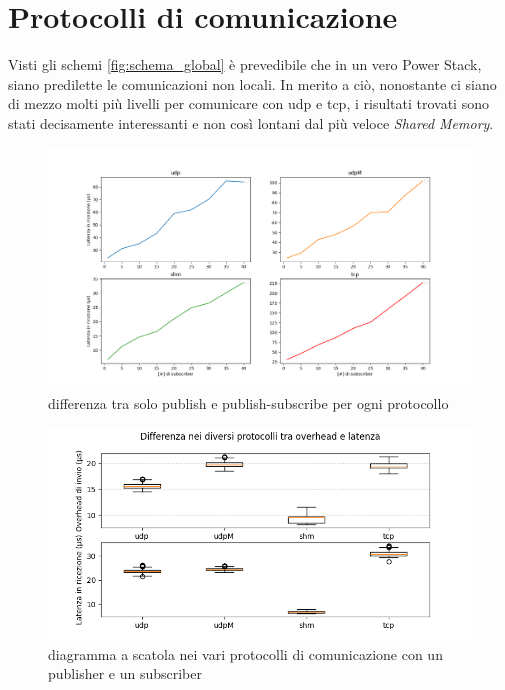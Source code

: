 \section{Protocolli di comunicazione}
Visti gli schemi \ref{fig:schema_global} è prevedibile che in un vero Power Stack, siano predilette le comunicazioni non locali. In merito a ciò, nonostante ci siano di mezzo molti più livelli per comunicare con udp e tcp, i risultati trovati sono stati decisamente interessanti e non così lontani dal più veloce \emph{Shared Memory}.

\begin{figure}[H]
    \includegraphics[width=\textwidth]{./results/test3_different_protocol_send_receive.png} 
        \caption{differenza tra solo publish e publish-subscribe per ogni protocollo}%
        \label{fig:test3_different_protocols}
\end{figure}


\begin{figure}[H]
    \includegraphics[width=\textwidth]{./results/test1_box_sr_1p1s.png} 
        \caption{diagramma a scatola nei vari protocolli di comunicazione con un publisher e un subscriber}
        \label{fig:test1sdbox}
\end{figure}

